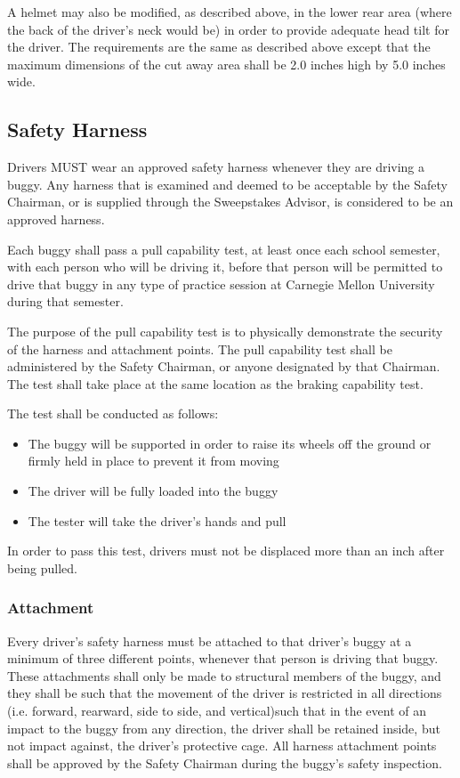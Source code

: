 	A helmet may also be modified, as described above, in the lower rear area (where the back of the driver's neck would be) in order to provide adequate head tilt for the driver. The requirements are the same as described above except that the maximum dimensions of the cut away area shall be 2.0 inches high by 5.0 inches wide.

\subsection{Safety Harness}

	Drivers MUST wear an approved safety harness whenever they are driving a buggy. Any harness that is examined and deemed to be acceptable by the Safety Chairman, or is supplied through the Sweepstakes Advisor, is considered to be an approved harness. 

	Each buggy shall pass a pull capability test, at least once each school semester, with each person who will be driving it, before that person will be permitted to drive that buggy in any type of practice session at Carnegie Mellon University during that semester. 

	The purpose of the pull capability test is to physically demonstrate the security of the harness and attachment points. The pull capability test shall be administered by the Safety Chairman, or anyone designated by that Chairman. The test shall take place at the same location as the braking capability test. 

	The test shall be conducted as follows: 
	\begin{itemize}
		\item
		The buggy will be supported in order to raise its wheels off the ground or firmly held in place to prevent it from moving

		\item
		The driver will be fully loaded into the buggy
	
		\item
		The tester will take the driver's hands and pull		
	\end{itemize}

	In order to pass this test, drivers must not be displaced more than an inch after being pulled. 


\subsubsection{Attachment}

	Every driver's safety harness must be attached to that driver's buggy at a minimum of three different points, whenever that person is driving that buggy. These attachments shall only be made to structural members of the buggy, and they shall be such that the movement of the driver is restricted in all directions (i.e. forward, rearward, side to side, and vertical)such that in the event of an impact to the buggy from any direction, the driver shall be retained inside, but not impact against, the driver's protective cage. All harness attachment points shall be approved by the Safety Chairman during the buggy's safety inspection.
	
